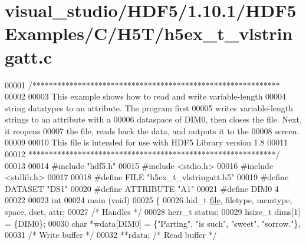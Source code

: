 \hypertarget{visual__studio_2_h_d_f5_21_810_81_2_h_d_f5_examples_2_c_2_h5_t_2h5ex__t__vlstringatt_8c_source}{}\section{visual\+\_\+studio/\+H\+D\+F5/1.10.1/\+H\+D\+F5\+Examples/\+C/\+H5\+T/h5ex\+\_\+t\+\_\+vlstringatt.c}
\label{visual__studio_2_h_d_f5_21_810_81_2_h_d_f5_examples_2_c_2_h5_t_2h5ex__t__vlstringatt_8c_source}

\begin{DoxyCode}
00001 \textcolor{comment}{/************************************************************}
00002 \textcolor{comment}{}
00003 \textcolor{comment}{  This example shows how to read and write variable-length}
00004 \textcolor{comment}{  string datatypes to an attribute.  The program first}
00005 \textcolor{comment}{  writes variable-length strings to an attribute with a}
00006 \textcolor{comment}{  dataspace of DIM0, then closes the file.  Next, it reopens}
00007 \textcolor{comment}{  the file, reads back the data, and outputs it to the}
00008 \textcolor{comment}{  screen.}
00009 \textcolor{comment}{}
00010 \textcolor{comment}{  This file is intended for use with HDF5 Library version 1.8}
00011 \textcolor{comment}{}
00012 \textcolor{comment}{ ************************************************************/}
00013 
00014 \textcolor{preprocessor}{#include "hdf5.h"}
00015 \textcolor{preprocessor}{#include <stdio.h>}
00016 \textcolor{preprocessor}{#include <stdlib.h>}
00017 
00018 \textcolor{preprocessor}{#define FILE            "h5ex\_t\_vlstringatt.h5"}
00019 \textcolor{preprocessor}{#define DATASET         "DS1"}
00020 \textcolor{preprocessor}{#define ATTRIBUTE       "A1"}
00021 \textcolor{preprocessor}{#define DIM0            4}
00022 
00023 \textcolor{keywordtype}{int}
00024 main (\textcolor{keywordtype}{void})
00025 \{
00026     hid\_t       \hyperlink{structfile}{file}, filetype, memtype, space, dset, attr;
00027                                             \textcolor{comment}{/* Handles */}
00028     herr\_t      status;
00029     hsize\_t     dims[1] = \{DIM0\};
00030     \textcolor{keywordtype}{char}        *wdata[DIM0] = \{\textcolor{stringliteral}{"Parting"}, \textcolor{stringliteral}{"is such"}, \textcolor{stringliteral}{"sweet"}, \textcolor{stringliteral}{"sorrow."}\},
00031                                             \textcolor{comment}{/* Write buffer */}
00032                 **rdata;                    \textcolor{comment}{/* Read buffer */}

\end{DoxyCode}
